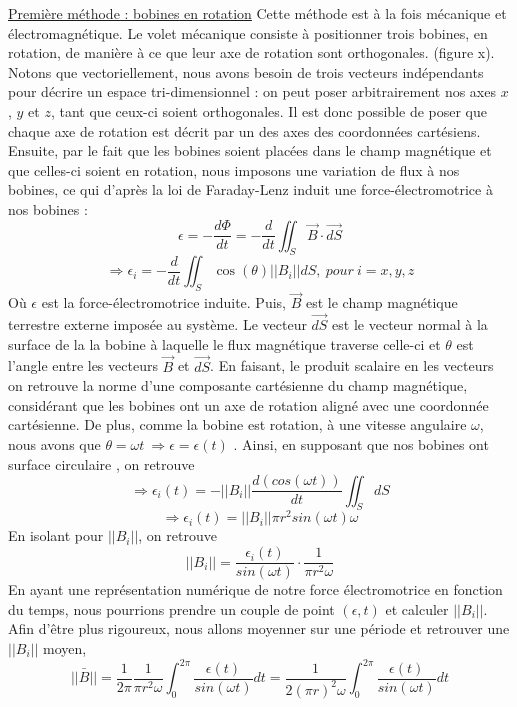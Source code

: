 \documentclass{standalone}
\author{Bastien Gauthier-Soumis,\\
 Edward Halle-Hannan, ,\\
Massine Kadi, ,\\
Félix Pelletier, }
\begin{document}
\underline{Première méthode : bobines en rotation}
Cette méthode est à la fois mécanique et électromagnétique. Le volet mécanique consiste à positionner trois bobines, en rotation, de manière à ce que leur axe de rotation sont orthogonales. (figure x). Notons que vectoriellement, nous avons besoin de trois vecteurs indépendants pour décrire un espace tri-dimensionnel : on peut poser arbitrairement nos axes $x$, $y$ et $z$, tant que ceux-ci soient orthogonales. Il est donc possible de poser que chaque axe de rotation est décrit par un des axes des coordonnées cartésiens.  \\

Ensuite, par le fait que les bobines soient placées dans le champ magnétique et que celles-ci soient en rotation, nous imposons une variation de flux à nos bobines, ce qui d'après la loi de Faraday-Lenz induit une force-électromotrice à nos bobines : 
\begin{equation}
\epsilon = -\frac{d \Phi}{dt} = -\frac{d}{dt} \iint_S  \vec{B}  \cdot \vec{dS}
\end{equation}
\[ \Rightarrow \epsilon_i  = -\frac{d}{dt} \iint_S \cos(\theta) ||B_i|| dS, \ pour \ i=x,y,z  \] 
Où $ \epsilon $ est la force-électromotrice induite. Puis,  $ \vec{B}$ est le champ magnétique terrestre externe imposée au système. Le vecteur $ \vec{dS}$ est le vecteur normal à la surface de la la bobine à laquelle le flux magnétique traverse celle-ci et $\theta$ est l'angle entre les vecteurs $\vec{B}$ et $\vec{dS}$. En faisant, le produit scalaire en les vecteurs on retrouve la norme d'une composante cartésienne du champ magnétique, considérant que les bobines ont un axe de rotation aligné avec une coordonnée cartésienne. De plus, comme la bobine est rotation, à une vitesse angulaire $\omega$, nous avons que $\theta = \omega t \ \Rightarrow \epsilon = \epsilon(t)$ . Ainsi, en supposant que nos bobines ont surface circulaire , on retrouve 
\[ \Rightarrow \epsilon_i(t)  = -||B_i||\frac{d (cos(\omega t))}{dt} \iint_S dS  \]  
\[ \Rightarrow \epsilon_i(t) = ||B_i|| \pi r^2 sin(\omega t) \omega \]
En isolant pour $||B_i||$, on retrouve
\[ ||B_i|| = \frac{ \epsilon_i(t)}{sin(\omega t)} \cdot \frac{1}{\pi r^2 \omega} \]
En ayant une représentation numérique de notre force électromotrice en fonction du temps, nous pourrions prendre un couple de point $(\epsilon,t)$ et calculer $||B_i||$. Afin d'être plus rigoureux, nous allons moyenner sur une période et retrouver une $||B_i||$ moyen,
\begin{equation}
\bar{||B||} = \frac{1}{2\pi} \frac{1}{\pi r^2 \omega} \int_{0}^{2\pi} \frac{\epsilon(t)}{sin(\omega t)} dt = \frac{1}{2(\pi r)^2 \omega} \int_{0}^{2\pi} \frac{\epsilon(t)}{sin(\omega t)} dt
\end{equation}
\end{document}
